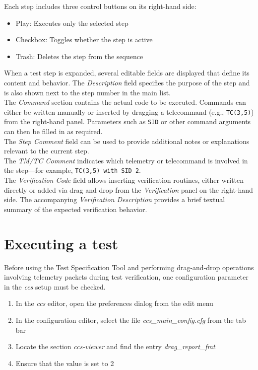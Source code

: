 Each step includes three control buttons on its right-hand side:
\begin{itemize}
\item Play: Executes only the selected step
\item Checkbox: Toggles whether the step is active
\item Trash: Deletes the step from the sequence
\end{itemize}


When a test step is expanded, several editable fields are displayed that define its content and behavior. 
The \emph{Description} field specifies the purpose of the step and is also shown next to the step number in the main list. \\

The \emph{Command} section contains the actual code to be executed. 
Commands can either be written manually or inserted by dragging a telecommand (e.g., \texttt{TC(3,5)}) from the right-hand panel. 
Parameters such as \texttt{SID} or other command arguments can then be filled in as required.\\

The \emph{Step Comment} field can be used to provide additional notes or explanations relevant to the current step.\\

The \emph{TM/TC Comment} indicates which telemetry or telecommand is involved in the step—for example, \texttt{TC(3,5) with SID 2}.\\

The \emph{Verification Code} field allows inserting verification routines, either written directly or added via drag and drop from the \emph{Verification} panel on the right-hand side. 
The accompanying \emph{Verification Description} provides a brief textual summary of the expected verification behavior.\\




\section{Executing a test}
\label{sec:exectest}
Before using the Test Specification Tool and performing drag-and-drop operations involving telemetry packets during test verification, one configuration parameter in the \textit{ccs} setup must be checked.

\begin{enumerate}
    \item In the \textit{ccs} editor, open the preferences dialog from the edit menu
    
    \item In the configuration editor, select the file \emph{ccs\_main\_config.cfg} from the tab bar

    \item Locate the section \emph{ccs-viewer} and find the entry \emph{drag\_report\_fmt}

    \item Ensure that the value is set to 2
    
\end{enumerate}


